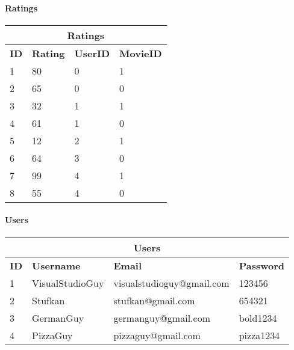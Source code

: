 \paragraph{Ratings}

\begin{center}
\begin{tabular}{|l|l|l|l|}
\hline
\multicolumn{4}{|c|}{Ratings} \\ \hline \hline
\textbf{ID} & \textbf{Rating} & \textbf{UserID} & \textbf{MovieID} \\ \hline \hline
1 & 80 & 0 & 1 \\ \hline
2 & 65 & 0 & 0 \\ \hline
3 & 32 & 1 & 1 \\ \hline
4 & 61 & 1 & 0 \\ \hline
5 & 12 & 2 & 1 \\ \hline
6 & 64 & 3 & 0 \\ \hline
7 & 99 & 4 & 1 \\ \hline
8 & 55 & 4 & 0 \\ \hline
\end{tabular}
\end{center}

\paragraph{Users}

\begin{center}
\begin{tabular}{|l|l|l|l|}
\hline
\multicolumn{4}{|c|}{Users} \\ \hline \hline
\textbf{ID} & \textbf{Username} & \textbf{Email} & \textbf{Password} \\ \hline \hline
1 & VisualStudioGuy & visualstudioguy@gmail.com & 123456 \\ \hline
2 & Stufkan & stufkan@gmail.com & 654321 \\ \hline
3 & GermanGuy & germanguy@gmail.com & bold1234 \\ \hline
4 & PizzaGuy & pizzaguy@gmail.com & pizza1234 \\ \hline
\end{tabular}
\end{center}

